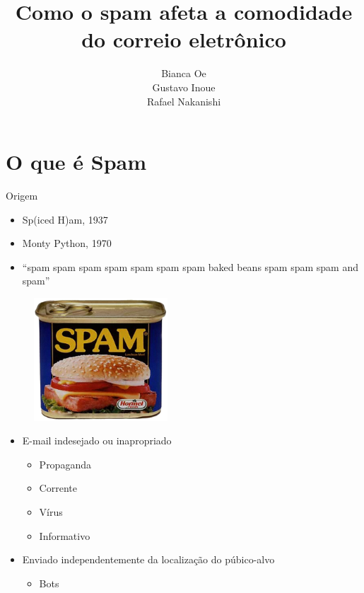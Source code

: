 \documentclass[dvipdfm]{beamer}
\title{Como o spam afeta a comodidade do correio eletrônico}
\author{Bianca Oe\\
		Gustavo Inoue\\
		Rafael Nakanishi}
\institute{Instituto de Ciências Matemáticas e Computação}
\begin{document}
\begin{frame}
	\titlepage
\end{frame}

\begin{frame}
\end{frame}

\section{O que é Spam}
\begin{frame}{Origem}
	\begin{itemize}
		\item Sp(iced H)am, 1937
		\item Monty Python, 1970 \cite{mpit}
		\item “spam spam spam spam spam spam spam baked beans  spam spam spam and  spam”
	\end{itemize}

	\begin{figure}[h]
		\centering
		\includegraphics[width=5cm]{spam.png}
	\end{figure}
\end{frame}

\begin{frame}
	\begin{itemize}
		\item E-mail indesejado ou inapropriado
		\begin{itemize}
			\item Propaganda
			\item Corrente
			\item Vírus
			\item Informativo
		\end{itemize}	
		\item Enviado independentemente da localização do púbico-alvo
		\begin{itemize}
			\item Bots
		\end{itemize}
	\end{itemize}
\end{frame}
\end{document}

